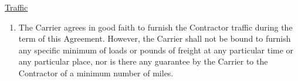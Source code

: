 \underline{Traffic}
\begin{enumerate}
    \item The Carrier agrees in good faith to furnish the Contractor
    traffic during the term of this Agreement. However, the Carrier shall
    not be bound to furnish any specific minimum of loads or pounds of
    freight at any particular time or any particular place, nor is there
    any guarantee by the Carrier to the Contractor of a minimum number of
    miles.
\end{enumerate}